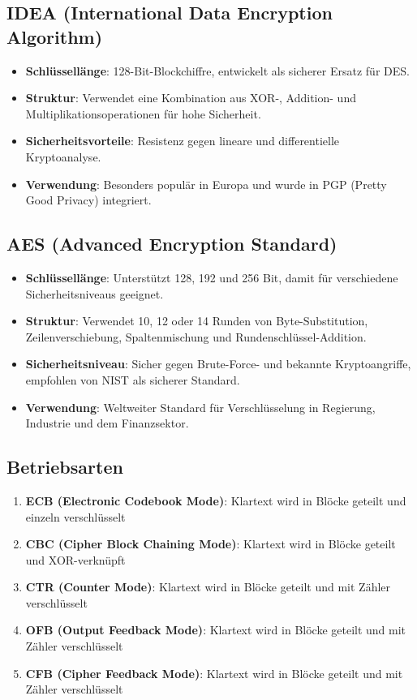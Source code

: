 \documentclass{article}
\begin{document}
\subsection{IDEA (International Data Encryption Algorithm)}
\begin{itemize}
  \item \textbf{Schlüssellänge}: 128-Bit-Blockchiffre, entwickelt als sicherer Ersatz für DES.
  \item \textbf{Struktur}: Verwendet eine Kombination aus XOR-, Addition- und Multiplikationsoperationen für hohe Sicherheit.
  \item \textbf{Sicherheitsvorteile}: Resistenz gegen lineare und differentielle Kryptoanalyse.
  \item \textbf{Verwendung}: Besonders populär in Europa und wurde in PGP (Pretty Good Privacy) integriert.
\end{itemize}

\subsection{AES (Advanced Encryption Standard)}
\begin{itemize}
  \item \textbf{Schlüssellänge}: Unterstützt 128, 192 und 256 Bit, damit für verschiedene Sicherheitsniveaus geeignet.
  \item \textbf{Struktur}: Verwendet 10, 12 oder 14 Runden von Byte-Substitution, Zeilenverschiebung, Spaltenmischung und Rundenschlüssel-Addition.
  \item \textbf{Sicherheitsniveau}: Sicher gegen Brute-Force- und bekannte Kryptoangriffe, empfohlen von NIST als sicherer Standard.
  \item \textbf{Verwendung}: Weltweiter Standard für Verschlüsselung in Regierung, Industrie und dem Finanzsektor.
\end{itemize}

\subsection{Betriebsarten}
\begin{enumerate}
  \item \textbf{ECB (Electronic Codebook Mode)}: Klartext wird in Blöcke geteilt und einzeln verschlüsselt
  \item \textbf{CBC (Cipher Block Chaining Mode)}: Klartext wird in Blöcke geteilt und XOR-verknüpft
  \item \textbf{CTR (Counter Mode)}: Klartext wird in Blöcke geteilt und mit Zähler verschlüsselt
  \item \textbf{OFB (Output Feedback Mode)}: Klartext wird in Blöcke geteilt und mit Zähler verschlüsselt
  \item \textbf{CFB (Cipher Feedback Mode)}: Klartext wird in Blöcke geteilt und mit Zähler verschlüsselt
\end{enumerate}
\end{document}

